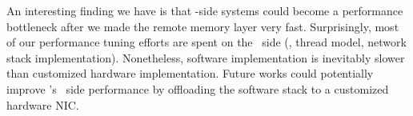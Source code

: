 An interesting finding we have is that \CN-side systems
could become a performance bottleneck after we made the remote memory layer very fast.
Surprisingly, most of our performance tuning efforts are spent on the \CN\ side (\eg, thread model, network stack implementation).
Nonetheless, software implementation is inevitably slower than customized hardware implementation.
Future works could potentially improve \sys's \CN\ side performance by offloading the software stack to a customized hardware NIC.
